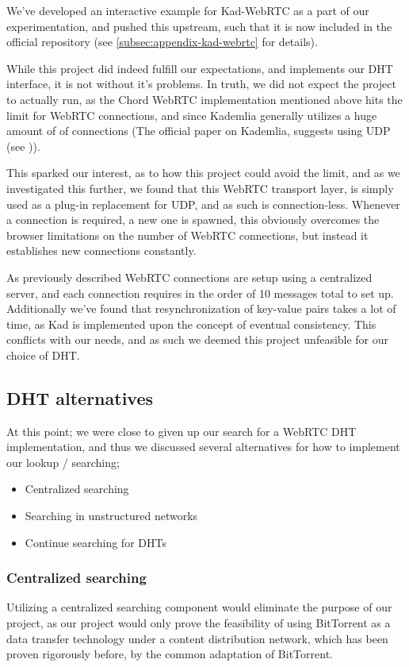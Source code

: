 We've developed an interactive example for Kad-WebRTC as a part of our
experimentation, and pushed this upstream, such that it is now included in 
the official repository (see \ref{subsec:appendix-kad-webrtc} for details).

While this project did indeed fulfill our expectations, and implements our \acs{DHT}
interface, it is not without it's problems. In truth, we did not expect the 
project to actually run, as the Chord WebRTC implementation mentioned above hits
the limit for WebRTC connections, and since Kademlia generally utilizes a huge
amount of of connections (The official paper on Kademlia, suggests using \acs{UDP}
(see \citep{Maymounkov:Kademlia})).

This sparked our interest, as to how this project could avoid the limit, and as
we investigated this further, we found that this WebRTC transport layer, is
simply used as a plug-in replacement for \acs{UDP}, and as such is connection-less.
Whenever a connection is required, a new one is spawned, this obviously
overcomes the browser limitations on the number of WebRTC connections, but 
instead it establishes new connections constantly.

As previously described WebRTC connections are setup using a centralized server,
and each connection requires in the order of 10 messages total to set up.
Additionally we've found that resynchronization of key-value pairs takes a lot
of time, as Kad is implemented upon the concept of eventual consistency. This
conflicts with our needs, and as such we deemed this project unfeasible for
our choice of \acs{DHT}.

\subsection{\acs{DHT} alternatives}
At this point; we were close to given up our search for a WebRTC \acs{DHT}
implementation, and thus we discussed several alternatives for how to
implement our lookup / searching;
\begin{itemize}
\item Centralized searching
\item Searching in unstructured networks
\item Continue searching for \acs{DHT}s
\end{itemize}

\subsubsection{Centralized searching}
Utilizing a centralized searching component would eliminate the purpose of our
project, as our project would only prove the feasibility of using BitTorrent as
a data transfer technology under a content distribution network, which has been
proven rigorously before, by the common adaptation of BitTorrent.

